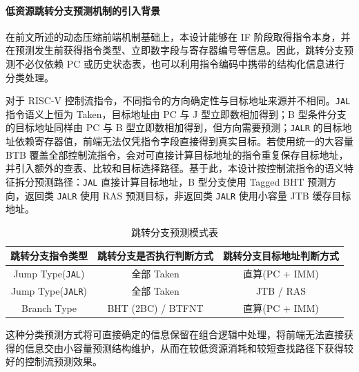 ﻿\documentclass[12pt,a4paper]{ctexart}
\begin{document}
\paragraph{低资源跳转分支预测机制的引入背景}
    在前文所述的动态压缩前端机制基础上，本设计能够在 IF 阶段取得指令本身，并在预测发生前获得指令类型、立即数字段与寄存器编号等信息。因此，跳转分支预测不必仅依赖 PC 或历史状态表，也可以利用指令编码中携带的结构化信息进行分类处理。\par\indent
    对于 RISC-V 控制流指令，不同指令的方向确定性与目标地址来源并不相同。\texttt{JAL} 指令语义上恒为 Taken，目标地址由 PC 与 J 型立即数相加得到；B 型条件分支的目标地址同样由 PC 与 B 型立即数相加得到，但方向需要预测；\texttt{JALR} 的目标地址依赖寄存器值，前端无法仅凭指令字段直接得到真实目标。若使用统一的大容量 BTB 覆盖全部控制流指令，会对可直接计算目标地址的指令重复保存目标地址，并引入额外的查表、比较和目标选择路径。基于此，本设计按控制流指令的语义特征拆分预测路径：\texttt{JAL} 直接计算目标地址，B 型分支使用 Tagged BHT 预测方向，返回类 \texttt{JALR} 使用 RAS 预测目标，非返回类 \texttt{JALR} 使用小容量 JTB 缓存目标地址。\\
    \begin{table}[H]
        \centering
        \begin{tabular}{|c|c|c|}\hline
            跳转分支指令类型 & 跳转分支是否执行判断方式 & 跳转分支目标地址判断方式 \\\hline\hline
            Jump Type(\texttt{JAL}) & 全部 Taken & 直算(PC + IMM) \\\hline
            Jump Type(\texttt{JALR}) & 全部 Taken & JTB / RAS \\\hline
            Branch Type & BHT (2BC) / BTFNT & 直算(PC + IMM) \\\hline
        \end{tabular}
        \caption{跳转分支预测模式表}
    \end{table}
    这种分类预测方式将可直接确定的信息保留在组合逻辑中处理，将前端无法直接获得的信息交由小容量预测结构维护，从而在较低资源消耗和较短查找路径下获得较好的控制流预测效果。
\end{document}
